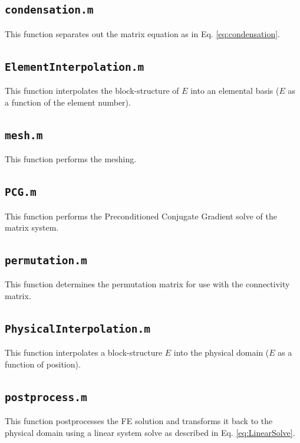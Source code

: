 \documentclass[10pt]{article}
\begin{document}
\subsection{\texttt{condensation.m}}
This function separates out the matrix equation as in Eq. \eqref{eq:condensation}.


\subsection{\texttt{ElementInterpolation.m}}
This function interpolates the block-structure of \(E\) into an elemental basis (\(E\) as a function of the element number).


\subsection{\texttt{mesh.m}}
This function performs the meshing.


\subsection{\texttt{PCG.m}}
This function performs the Preconditioned Conjugate Gradient solve of the matrix system.


\subsection{\texttt{permutation.m}}
This function determines the permutation matrix for use with the connectivity matrix.


\subsection{\texttt{PhysicalInterpolation.m}}
This function interpolates a block-structure \(E\) into the physical domain (\(E\) as a function of position).


\subsection{\texttt{postprocess.m}}
This function postprocesses the FE solution and transforms it back to the physical domain using a linear system solve as described in Eq. \eqref{eq:LinearSolve}.

\end{document}
